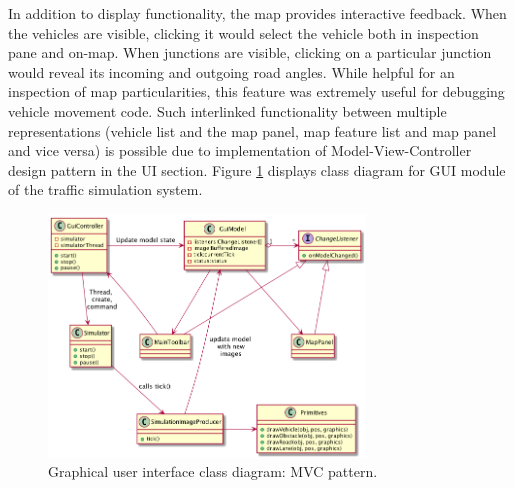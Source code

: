 In addition to display functionality, the map provides interactive feedback. When the vehicles are visible, clicking it would select the vehicle both in inspection pane and on-map. When junctions are visible, clicking on a particular junction would reveal its incoming and outgoing road angles. While helpful for an inspection of map particularities, this feature was extremely useful for debugging vehicle movement code. Such interlinked functionality between multiple representations (vehicle list and the map panel, map feature list and map panel and vice versa) is possible due to implementation of Model-View-Controller design pattern in the UI section. Figure \ref{fig:guiMVC} displays class diagram for GUI module of the traffic simulation system.

\begin{figure}[h]
    \vspace{1.5em}
    \caption{Graphical user interface class diagram: MVC pattern.}
    \label{fig:guiMVC}
    \centering
    \includegraphics[width=0.75\textwidth]{../../uml_diagrams/GUI.png}
    \vspace{1.5em}
\end{figure}

